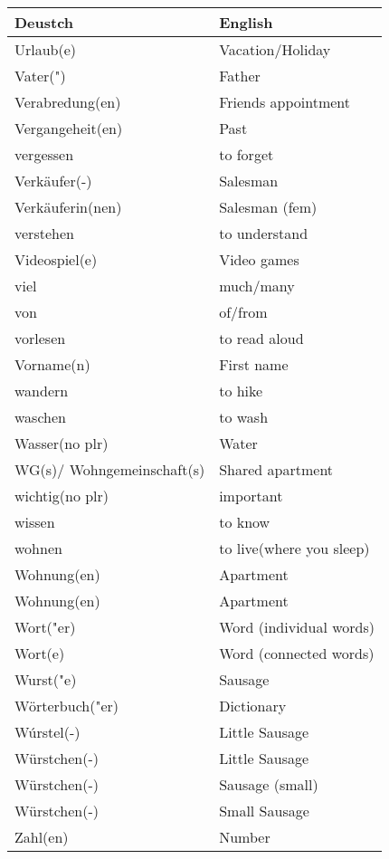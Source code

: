 \documentclass{article}
\renewcommand{\arraystretch}{1}
\begin{document}
\begin{minipage}{0.48\textwidth}
    \centering
    \renewcommand{\arraystretch}{1.5}
    \begin{tabular}{|>{\raggedright\arraybackslash}p{3.5cm}|>{\raggedright\arraybackslash}p{3.5cm}|}
        \hline
        \rowcolor{gray!20} \textbf{Deustch} & \textbf{English} \\
        \hline
        Urlaub(e) & Vacation/Holiday \\\hline
        Vater(") & Father \\\hline
        Verabredung(en) & Friends appointment \\\hline
        Vergangeheit(en) & Past \\\hline
        vergessen & to forget \\\hline
        Verkäufer(-) & Salesman \\\hline
        Verkäuferin(nen) & Salesman (fem) \\\hline
        verstehen & to understand \\\hline
        Videospiel(e) & Video games \\\hline
        viel & much/many \\\hline
        von & of/from \\\hline
        vorlesen & to read aloud \\\hline
        Vorname(n) & First name \\\hline
        wandern & to hike \\\hline
        waschen & to wash \\\hline
        Wasser(no plr) & Water \\\hline
        WG(s)/ Wohngemeinschaft(s) & Shared apartment \\\hline
        wichtig(no plr) & important \\\hline
        wissen & to know \\\hline
        wohnen & to live(where you sleep) \\\hline
        Wohnung(en) & Apartment \\\hline
        Wohnung(en) & Apartment \\\hline
        Wort("er) & Word (individual words) \\\hline
        Wort(e) & Word (connected words) \\\hline
        Wurst("e) & Sausage \\\hline
        Wörterbuch("er) & Dictionary \\\hline
        Wúrstel(-) & Little Sausage \\\hline
        Würstchen(-) & Little Sausage \\\hline
        Würstchen(-) & Sausage (small) \\\hline
        Würstchen(-) & Small Sausage \\\hline
        Zahl(en) & Number \\\hline
    \end{tabular}
\end{minipage}%
\end{document}
